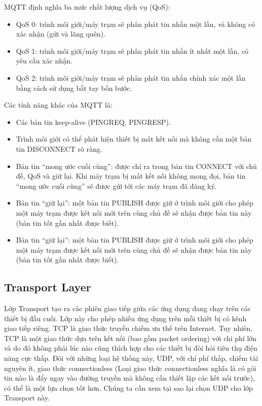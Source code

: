 \documentclass{report}
\begin{document}
MQTT định nghĩa ba mức chất lượng dịch vụ (QoS):
\begin{itemize}
\item QoS 0: trình môi giới/máy trạm sẽ phân phát tin nhắn một lần, và không có xác
nhận (gửi và lãng quên).
\item QoS 1: trình môi giới/máy trạm sẽ phân phát tin nhắn ít nhất một lần, có yêu cầu
xác nhận.
\item QoS 2: trình môi giới/máy trạm sẽ phân phát tin nhắn chính xác một lần bằng
cách sử dụng bắt tay bốn bước.
\end{itemize}
\newpage
Các tính năng khác của MQTT là:
\begin{itemize}
\item Các bản tin keep-alive (PINGREQ, PINGRESP).
\item Trình môi giới có thể phát hiện thiết bị mất kết nối mà không cần một bản tin
DISCONNECT rõ ràng.
\item Bản tin “mong ước cuối cùng”: được chỉ ra trong bản tin CONNECT với chủ đề,
QoS và giữ lại. Khi máy trạm bị mất kết nối không mong đọi, bản tin “mong ước
cuối cùng” sẽ được gửi tới các máy trạm đã đăng ký.
\item Bản tin “giữ lại”: một bản tin PUBLISH được giữ ở trình môi giới cho phép một
máy trạm được kết nối mới trên cùng chủ đề sẽ nhận được bản tin này (bản tin
tốt gần nhất được biết).
\item Bản tin “giữ lại”: một bản tin PUBLISH được giữ ở trình môi giới cho phép một
máy trạm được kết nối mới trên cùng chủ đề sẽ nhận được bản tin này (bản tin
tốt gần nhất được biết).
\end{itemize}
\subsection{Transport Layer}
Lớp Transport tạo ra các phiên giao tiếp giữa các ứng dụng đang chạy trên các thiết bị đầu
cuối. Lớp này cho phép nhiều ứng dụng trên mỗi thiết bị có kênh giao tiếp riêng. TCP là giao
thức truyền chiếm ưu thế trên Internet. Tuy nhiên, TCP là một giao thức dựa trên kết nối
(bao gồm packet ordering) với chi phí lớn và do đó không phải lúc nào cũng thích hợp cho các
thiết bị đòi hỏi tiêu thụ điện năng cực thấp. Đôi với những loại hệ thống này, UDP, với chỉ phí
thấp, chiếm tài nguyên ít, giao thức connectionless (Loại giao thức connectionless nghĩa là có
gói tin nào là đẩy ngay vào đường truyền mà không cần thiết lập các kết nối trước), có thể là
một lựa chọn tốt hơn. Chúng ta cần xem tại sao lại chọn UDP cho lớp Transport này.\\
\end{document}
